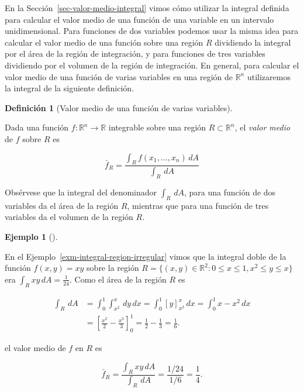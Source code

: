 \documentclass[
  a4paper,
]{scrreport}
\theoremstyle{definition}
\theoremstyle{definition}
\newtheorem{example}{Ejemplo}[chapter]
\theoremstyle{definition}
\newtheorem{definition}{Definición}[chapter]
\theoremstyle{plain}
\theoremstyle{plain}
\theoremstyle{plain}
\theoremstyle{remark}
\begin{document}
En la Sección~\ref{sec-valor-medio-integral} vimos cómo utilizar la
integral definida para calcular el valor medio de una función de una
variable en un intervalo unidimensional. Para funciones de dos variables
podemos usar la misma idea para calcular el valor medio de una función
sobre una región \(R\) dividiendo la integral por el área de la región
de integración, y para funciones de tres variables dividiendo por el
volumen de la región de integración. En general, para calcular el valor
medio de una función de varias variables en una región de
\(\mathbb{R}^n\) utilizaremos la integral de la siguiente definición.

\begin{definition}[Valor medio de una función de varias
variables]\protect\hypertarget{def-valor-medio-funcion-varias-variables}{}\label{def-valor-medio-funcion-varias-variables}

Dada una función \(f:\mathbb{R}^n\to \mathbb{R}\) integrable sobre una
región \(R\subset \mathbb{R}^n\), el \emph{valor medio} de \(f\) sobre
\(R\) es

\[
\bar{f}_R = \frac{\int_R f(x_1,\ldots,x_n)\,dA}{\int_R\,dA}
\]

\end{definition}

\begin{tcolorbox}[enhanced jigsaw, bottomtitle=1mm, title=\textcolor{quarto-callout-note-color}{\faInfo}\hspace{0.5em}{Nota}, colbacktitle=quarto-callout-note-color!10!white, coltitle=black, leftrule=.75mm, colback=white, toptitle=1mm, toprule=.15mm, titlerule=0mm, opacitybacktitle=0.6, colframe=quarto-callout-note-color-frame, bottomrule=.15mm, arc=.35mm, rightrule=.15mm, breakable, left=2mm, opacityback=0]

Obsérvese que la integral del denominador \(\int_R\,dA\), para una
función de dos variables da el área de la región \(R\), mientras que
para una función de tres variables da el volumen de la región \(R\).

\end{tcolorbox}

\begin{example}[]\protect\hypertarget{exm-valor-medio-funcion-varias-variables}{}\label{exm-valor-medio-funcion-varias-variables}

En el Ejemplo~\ref{exm-integral-region-irregular} vimos que la integral
doble de la función \(f(x,y)=xy\) sobre la región
\(R=\{(x,y)\in \mathbb{R}^2: 0\leq x\leq 1, x^2\leq y\leq x\}\) era
\(\int_R xy\,dA = \frac{1}{24}\). Como el área de la región \(R\) es

\begin{align*}
\int_R \,dA
&= \int_0^1 \int_{x^2}^x  \,dy\,dx
= \int_0^1 [y]_{x^2}^x\,dx
= \int_0^1 x-x^2\,dx \\
&= \left[\frac{x^2}{2}-\frac{x^3}{3}\right]_0^1
= \frac{1}{2}-\frac{1}{3}
= \frac{1}{6}.
\end{align*}

el valor medio de \(f\) en \(R\) es

\[
 \bar f_R 
 = \frac{\int_R xy\,dA}{\int_R\,dA}
 = \frac{1/24}{1/6} 
 = \frac{1}{4}.
 \]

\end{example}
\end{document}
